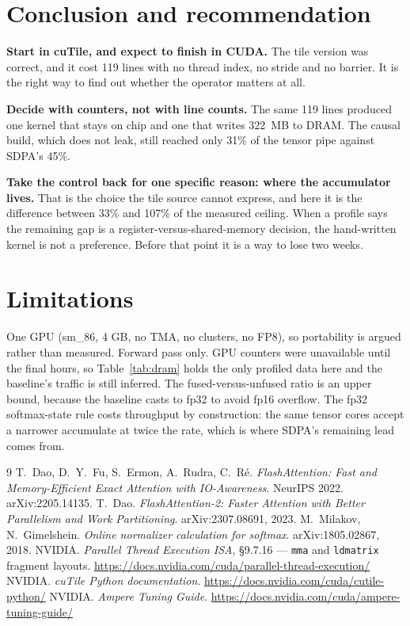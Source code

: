\documentclass[10pt,a4paper]{article}
\begin{document}
\section{Conclusion and recommendation}\label{sec:rec}

\textbf{Start in cuTile, and expect to finish in CUDA.} The tile version was correct, and it cost 119
lines with no thread index, no stride and no barrier. It is the right way to find out whether the
operator matters at all.

\textbf{Decide with counters, not with line counts.} The same 119 lines produced one kernel that stays
on chip and one that writes \SI{322}{MB} to DRAM. The causal build, which does not leak, still reached
only 31\% of the tensor pipe against SDPA's 45\%.

\textbf{Take the control back for one specific reason: where the accumulator lives.} That is the choice
the tile source cannot express, and here it is the difference between 33\% and 107\% of the measured
ceiling. When a profile says the remaining gap is a register-versus-shared-memory decision, the
hand-written kernel is not a preference. Before that point it is a way to lose two weeks.

\section*{Limitations}
One GPU (sm\_86, 4 GB, no TMA, no clusters, no FP8), so portability is argued rather than measured.
Forward pass only. GPU counters were unavailable until the final hours, so Table~\ref{tab:dram} holds
the only profiled data here and the baseline's traffic is still inferred. The fused-versus-unfused ratio
is an upper bound, because the baseline casts to fp32 to avoid fp16 overflow. The fp32 softmax-state
rule costs throughput by construction: the same tensor cores accept a narrower accumulate at twice the
rate, which is where SDPA's remaining lead comes from.

\begin{thebibliography}{9}\footnotesize
\setlength{\itemsep}{1pt}\setlength{\parskip}{0pt}
 T.~Dao, D.~Y.~Fu, S.~Ermon, A.~Rudra, C.~R\'e. \emph{FlashAttention: Fast and
Memory-Efficient Exact Attention with IO-Awareness}. NeurIPS 2022. arXiv:2205.14135.
 T.~Dao. \emph{FlashAttention-2: Faster Attention with Better Parallelism and Work
Partitioning}. arXiv:2307.08691, 2023.
 M.~Milakov, N.~Gimelshein. \emph{Online normalizer calculation for softmax}.
arXiv:1805.02867, 2018.
 NVIDIA. \emph{Parallel Thread Execution ISA}, \S9.7.16 --- \texttt{mma} and
\texttt{ldmatrix} fragment layouts. \url{https://docs.nvidia.com/cuda/parallel-thread-execution/}
 NVIDIA. \emph{cuTile Python documentation}.
\url{https://docs.nvidia.com/cuda/cutile-python/}
 NVIDIA. \emph{Ampere Tuning Guide}.
\url{https://docs.nvidia.com/cuda/ampere-tuning-guide/}
\end{thebibliography}
\end{document}
